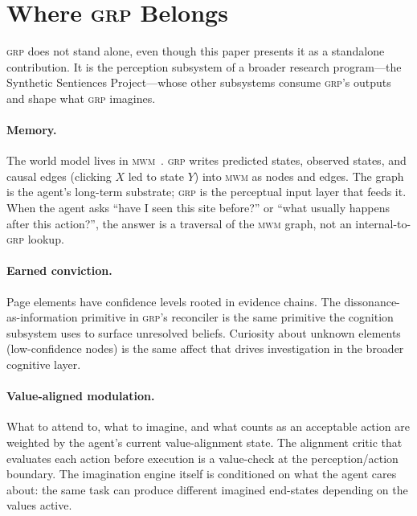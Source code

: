 \documentclass[12pt]{article}
\theoremstyle{definition}
\theoremstyle{remark}
\newcommand{\grp}{\textsc{grp}}
\begin{document}
\section{Where \grp{} Belongs}
\label{sec:integration}

\grp{} does not stand alone, even though this paper presents it as a
standalone contribution. It is the perception subsystem of a broader
research program---the Synthetic Sentiences Project---whose other
subsystems consume \grp{}'s outputs and shape what \grp{} imagines.

\paragraph{Memory.}
The world model lives in \textsc{mwm}~\cite{mwm}. \grp{} writes
predicted states, observed states, and causal edges (clicking $X$ led
to state $Y$) into \textsc{mwm} as nodes and edges. The graph is the
agent's long-term substrate; \grp{} is the perceptual input layer that
feeds it. When the agent asks ``have I seen this site before?'' or
``what usually happens after this action?'', the answer is a
traversal of the \textsc{mwm} graph, not an internal-to-\grp{} lookup.

\paragraph{Earned conviction.}
Page elements have confidence levels rooted in evidence chains. The
dissonance-as-information primitive in \grp{}'s reconciler is the same
primitive the cognition subsystem uses to surface unresolved beliefs.
Curiosity about unknown elements (low-confidence nodes) is the same
affect that drives investigation in the broader cognitive layer.

\paragraph{Value-aligned modulation.}
What to attend to, what to imagine, and what counts as an acceptable
action are weighted by the agent's current value-alignment state. The
alignment critic that evaluates each action before execution is a
value-check at the perception/action boundary. The imagination engine
itself is conditioned on what the agent cares about: the same task
can produce different imagined end-states depending on the values
active.
\end{document}
